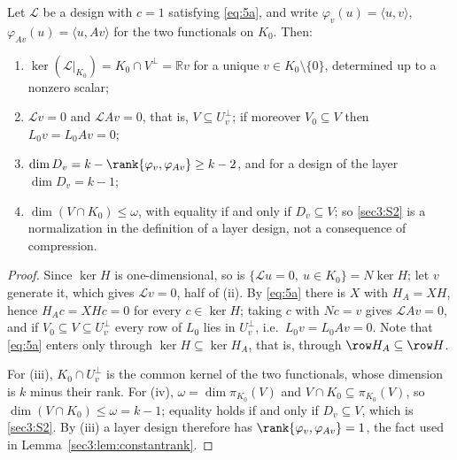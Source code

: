 \begin{lem}
\label{sec3:lem:direction}
\label{sec3:lem:Dv}
\label{sec3:rem:omega}
Let $\mathcal{L}$ be a design with $c=1$ satisfying \eqref{eq:5a}, and write
$\varphi_v(u)=\langle u,v\rangle$, $\varphi_{Av}(u)=\langle u,Av\rangle$ for the two functionals on
$K_0$. Then:
\begin{enumerate}[label=(\roman*),leftmargin=*,itemsep=1pt,topsep=2pt]
\item $\ker(\mathcal{L}|_{K_0})=K_0\cap V^\perp=\mathbb{R} v$ for a unique
$v\in K_0\setminus\{0\}$, determined up to a nonzero scalar;
\item $\mathcal{L}v=0$ and $\mathcal{L}Av=0$, that is, $V\subseteq U_v^\perp$; if moreover
$V_0\subseteq V$ then $L_0v=L_0Av=0$;
\item $\dim D_v=k-\rank\{\varphi_v,\varphi_{Av}\}\ge k-2$, and for a design of the layer
$\dim D_v=k-1$;
\item $\dim(V\cap K_0)\le\omega$, with equality if and only if $D_v\subseteq V$; so \ref{sec3:S2} is a
normalization in the definition of a layer design, not a consequence of compression.
\end{enumerate}
\end{lem}
\begin{proof}
Since $\ker H$ is one-dimensional, so is $\{\mathcal{L}u=0,\ u\in K_0\}=N\ker H$; let $v$ generate it,
which gives $\mathcal{L}v=0$, half of (ii). By \eqref{eq:5a} there is $X$ with $H_A=XH$, hence
$H_Ac=XHc=0$ for every $c\in\ker H$; taking $c$ with $Nc=v$ gives $\mathcal{L}Av=0$, and if
$V_0\subseteq V\subseteq U_v^\perp$ every row of $L_0$ lies in $U_v^\perp$, i.e.\ $L_0v=L_0Av=0$.
Note that \eqref{eq:5a} enters only through $\ker H\subseteq\ker H_A$, that is, through
$\row H_A\subseteq\row H$.

For (iii), $K_0\cap U_v^\perp$ is the common kernel of the two functionals, whose dimension is $k$
minus their rank. For (iv), $\omega=\dim\pi_{K_0}(V)$ and $V\cap K_0\subseteq\pi_{K_0}(V)$, so
$\dim(V\cap K_0)\le\omega=k-1$; equality holds if and only if $D_v\subseteq V$, which is
\ref{sec3:S2}. By (iii) a layer design therefore has $\rank\{\varphi_v,\varphi_{Av}\}=1$, the fact used in Lemma~\ref{sec3:lem:constantrank}.
\end{proof}

